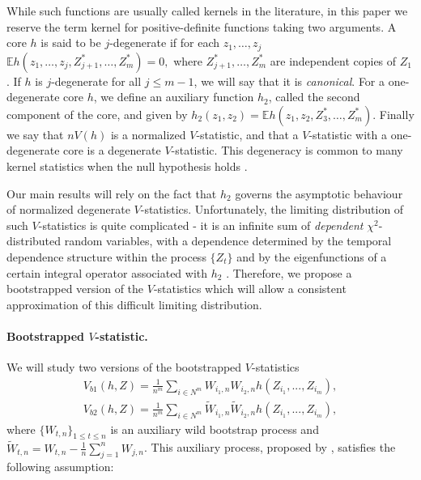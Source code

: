 \documentclass{article}
\newcommand{\ev}{\mathbb{E}}
\begin{document}
While such functions are usually called kernels in the literature, in this paper we reserve the term kernel for positive-definite functions taking two arguments. A core $h$ is said to be $j$-degenerate if for each $z_1,\ldots,z_j$ $\ev h(z_1,\ldots , z_j , Z_{j+1}^*,\ldots ,Z_m^*) = 0,$ where $Z_{j+1}^*,\ldots,Z_m^*$ are independent copies of $Z_1$. If $h$ is $j$-degenerate for all $j\leq m-1$, we will say that it is \emph{canonical}. For a one-degenerate core $h$, we define an auxiliary function $h_2$, called the second component of the core, and given by $h_2(z_1,z_2) = \ev h(z_1,z_2, Z_3^*,\ldots, Z_m^*).$ Finally we say that $nV(h)$ is a normalized $V$-statistic, and that a $V$-statistic with a one-degenerate core is a degenerate $V$-statistic.  This degeneracy is common to many kernel statistics when the null hypothesis holds \cite{gretton2012kernel,gretton_kernel_2008,sejdinovic2013kernel}.

Our main results will rely on the fact that $h_2$ governs the asymptotic behaviour of normalized degenerate $V$-statistics. Unfortunately, the limiting distribution of such $V$-statistics is quite complicated - it is an infinite sum of \emph{dependent} $\chi^2$-distributed random variables, with a dependence  determined by the temporal dependence structure within the process $\{Z_t\}$ and by the eigenfunctions of a certain integral operator associated with $h_2$ \cite{i._s._borisov_orthogonal_2009,chwialkowski2014kernel}. Therefore, we propose a bootstrapped version of the $V$-statistics which will allow a consistent approximation of this difficult limiting distribution.  

\paragraph{Bootstrapped $V$-statistic.} 
We will study two versions of the bootstrapped $V$-statistics  
\begin{align}
 V_{b1}(h,Z) = \frac{1}{n^m} \sum_{i \in N^m} \nolimits W_{i_1,n} W_{i_2,n} h(Z_{i_1},...,Z_{i_m}), \label{Vb1}\\ 
 V_{b2}(h,Z) = \frac{1}{n^m} \sum_{i \in N^m}  \nolimits \tilde W_{i_1,n}  \tilde W_{i_2,n} h(Z_{i_1},...,Z_{i_m}),\label{Vb2}
\end{align}
where $\{W_{t,n}\}_{1 \leq t \leq n }$ is an auxiliary wild bootstrap process and $\tilde W_{t,n} = W_{t,n} - \frac 1 n \sum_{j=1}^n W_{j,n}$. This auxiliary process, proposed by \cite{Shao2010,leucht_dependent_2013}, satisfies the following assumption:
\end{document}
